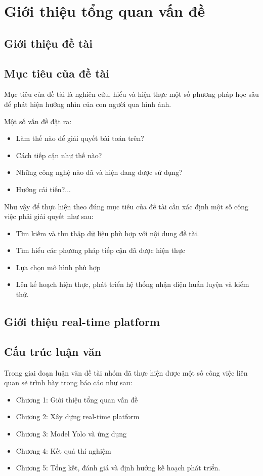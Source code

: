 \chapter{Giới thiệu tổng quan vấn đề}
	
\section{Giới thiệu đề tài}

\section{Mục tiêu của đề tài}
Mục tiêu của đề tài là nghiên cứu, hiểu và hiện thực một số phương pháp học sâu để phát hiện hướng nhìn của con người qua hình ảnh.

Một số vấn đề đặt ra: 
\begin{itemize}
\item Làm thế nào để giải quyết bài toán trên?
\item Cách tiếp cận như thế nào?
\item Những công nghệ nào đã và hiện đang được sử dụng?
\item Hướng cải tiến?...
\end{itemize}

Như vậy để thực hiện theo đúng mục tiêu của đề tài cần xác định một số công việc phải giải quyết như sau:
\begin{itemize}
\item Tìm kiếm và thu thập dữ liệu phù hợp với nội dung đề tài.
\item Tìm hiểu các phương pháp tiếp cận đã được hiện thực
\item Lựa chọn mô hình phù hợp
\item Lên kế hoạch hiện thực, phát triển hệ thống nhận diện huấn luyện và kiểm thử.
\end{itemize}
\section{Giới thiệu real-time platform}

\section{Cấu trúc luận văn}
Trong giai đoạn luận văn đề tài nhóm đã thực hiện được một số công việc liên quan sẽ trình bày trong báo cáo như sau:

\begin{itemize}
\item Chương 1: Giới thiệu tổng quan vấn đề
\item Chương 2: Xây dựng real-time platform
\item Chương 3: Model Yolo và ứng dụng
\item Chương 4: Kết quả thí nghiệm
\item Chương 5: Tổng kết, đánh giá và định hướng kế hoạch phát triển.
\end{itemize}
